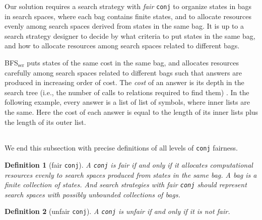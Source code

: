 \documentclass[format=acmlarge, review=true, authordraft=true]{acmart}
\newcommand{\conj}{\texttt{conj}}
\newcommand{\BFSser}[0]{BFS$_\textrm{ser}$}
\newtheorem{defn}{Definition}[section]
\begin{document}
\begin{center}
	\begin{tabular}{c}
		
	\end{tabular}
\end{center}

Our solution requires a search strategy with \emph{fair} \conj{} to organize
states in bags in search spaces, where each bag contains finite states, and 
to allocate resources evenly among search spaces derived from states in the 
same bag. It is up to a search strategy designer to decide by what criteria to 
put states in the same bag, and how to allocate resources among search spaces 
related to different bags.

\BFSser{} puts states of the same cost in the same bag, and allocates
resources carefully among search spaces related to different bags such
that answers are produced in increasing order of cost. The \emph{cost}
of an answer is its depth in the search tree (i.e., the number of
calls to relations required to find them) \citep{seres1999algebra}. In
the following example, every answer is a list of list of symbols,
where inner lists are the same. Here the cost of each answer is equal
to the length of its inner lists plus the length of its outer list.

\begin{center}
	\begin{tabular}{c}
		
	\end{tabular}
\end{center}

We end this subsection with precise definitions of all levels of \conj{} 
fairness. 


\begin{defn}[fair \conj{}]
A \conj{} is fair if and only if it allocates computational resources evenly to 
search spaces produced from states in the same bag. A bag is a finite 
collection of states. And search strategies with fair \conj{} should represent 
search spaces with possibly unbounded collections of bags. 
\end{defn}

\begin{defn}[unfair \conj{}]
A \conj{} is unfair if and only if it is not fair.
\end{defn}
\end{document}
